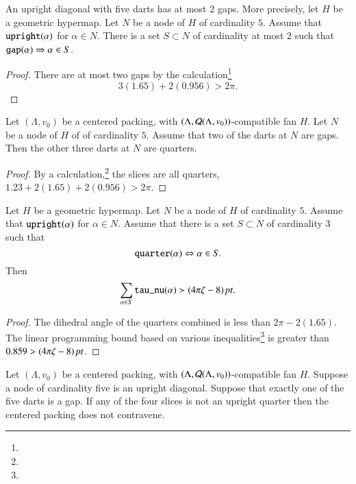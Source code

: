 \begin{lemma}  An upright diagonal with
five darts has at most $2$ gaps.  More precisely, let $H$ be a geometric
hypermap.  Let $N$ 
be a node of $H$ of cardinality $5$.   Assume that ${\operatorname{{\texttt{upright}}}}(\alpha)$
for $\alpha\in N$.  There is a set $S\subset N$ of cardinality at most
$2$ such that ${\operatorname{{\texttt{gap}}}}(\alpha) \Rightarrow \alpha\in S$.
\end{lemma}

\begin{proof}
There are at most
two gaps by the calculation\footnote{} %
    $$3(1.65)+2(0.956)>2\pi.$$
\end{proof}

\begin{lemma}\label{a:5dart:3q}
Let $(\Lambda,v_0)$ be a centered packing, 
with $(\Lambda,{\mathcal Q}(\Lambda,v_0))$-compatible fan $H$.
Let $N$ be a node of $H$ of  of cardinality $5$.  Assume that
two of the darts at $N$ are gaps.  Then the other three darts
at $N$ are quarters.
\end{lemma}

\begin{proof}
By a calculation,\footnote{} %
the slices are all quarters,
    $1.23+2(1.65)+2(0.956)>2\pi$.
\end{proof}

\begin{lemma}  Let $H$ be a geometric
hypermap.  Let $N$ be a node of $H$ of cardinality $5$.  Assume
that ${\operatorname{{\texttt{upright}}}}(\alpha)$ for $\alpha\in N$.  Assume that there
is a set $S\subset N$ of cardinality $3$ such that
  $${\operatorname{{\texttt{quarter}}}}(\alpha)\Leftrightarrow \alpha\in S.$$
Then 
  $$
  \sum_{\alpha\in S} {\operatorname{{\texttt{tau\_nu}}}}(\alpha) \succ (4\pi\zeta-8)\,\hbox{\it pt}.
  $$
\end{lemma}

\begin{proof}
The dihedral angle of the quarters combined is less than $2\pi-2(1.65)$.  
The linear programming
bound based on various inequalities\footnote{} %
is greater than $0.859>(4\pi\zeta-8)\,\hbox{\it pt}$.
\end{proof}



\begin{lemma}\label{lemma:4-crowdedq}
Let $(\Lambda,v_0)$ be a centered packing, 
with $(\Lambda,{\mathcal Q}(\Lambda,v_0))$-compatible fan $H$.
Suppose a node of cardinality five is an upright diagonal.
Suppose that exactly one of the five darts is a gap.
 If
any of the four slices is not an upright quarter then
the centered packing does not contravene.
\end{lemma}


